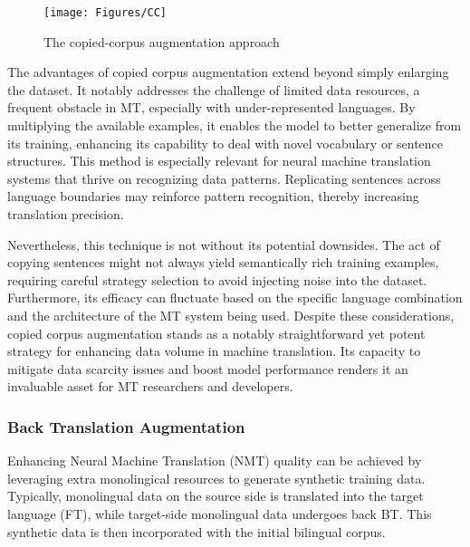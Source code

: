 \begin{figure}[H]
	\centering
	\texttt{[image: Figures/CC]}
	\caption{The copied-corpus augmentation approach}
	\label{fig:cc}
\end{figure}

The advantages of copied corpus augmentation extend beyond simply enlarging the dataset. 
It notably addresses the challenge of limited data resources, a frequent obstacle in MT, especially with under-represented languages. 
By multiplying the available examples, it enables the model to better generalize from its training, enhancing its capability to deal with novel vocabulary or sentence structures. 
This method is especially relevant for neural machine translation systems that thrive on recognizing data patterns. 
Replicating sentences across language boundaries may reinforce pattern recognition, thereby increasing translation precision.

Nevertheless, this technique is not without its potential downsides. 
The act of copying sentences might not always yield semantically rich training examples, requiring careful strategy selection to avoid injecting noise into the dataset. 
Furthermore, its efficacy can fluctuate based on the specific language combination and the architecture of the MT system being used.
Despite these considerations, copied corpus augmentation stands as a notably straightforward yet potent strategy for enhancing data volume in machine translation. 
Its capacity to mitigate data scarcity issues and boost model performance renders it an invaluable asset for MT researchers and developers.

\subsubsection{Back Translation Augmentation}
Enhancing Neural Machine Translation (NMT) quality can be achieved by leveraging extra monolingical resources to generate synthetic training data. 
Typically, monolingual data on the source side is translated into the target language (FT), while target-side monolingual data undergoes back BT. 
This synthetic data is then incorporated with the initial bilingual corpus. 

